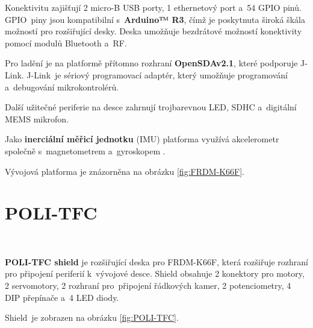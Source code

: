 Konektivitu zajišťují 2 micro-B USB porty, 1 ethernetový port a~54 GPIO pinů.
GPIO~piny jsou kompatibilní s~\textbf{Arduino™ R3}, čímž je poskytnuta široká škála
možností pro rozšiřující desky. Deska umožňuje bezdrátové možností konektivity
pomocí modulů Bluetooth a~RF.

Pro ladění je na platformě přítomno rozhraní \textbf{OpenSDAv2.1}, které podporuje
J-Link. J-Link~je sériový programovací adaptér, který umožňuje programování
a~debugování mikrokontrolérů.

Další užitečné periferie na desce zahrnují trojbarevnou LED, SDHC a~digitální MEMS
mikrofon.

Jako \textbf{inerciální měřicí jednotku} (IMU) platforma využívá akcelerometr
společně s~magnetometrem a~gyroskopem \cite{frdmk66UserGuide}.

Vývojová platforma je znázorněna na obrázku \ref{fig:FRDM-K66F}.

\section{POLI-TFC}
\label{sec:POLI-TFC}\

\textbf{POLI-TFC shield} je rozšiřující deska pro FRDM-K66F, která rozšiřuje
rozhraní pro připojení periferií k~vývojové desce. Shield obsahuje 2 konektory
pro motory, 2 servomotory, 2 rozhraní pro~připojení řádkových kamer, 2 
potenciometry, 4 DIP přepínače a~4 LED diody. 

Shield~je zobrazen na obrázku \ref{fig:POLI-TFC}.

